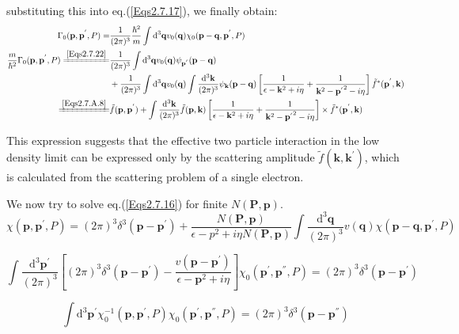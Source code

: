 substituting this into eq.(\ref{Eqs2.7.17}), we finally obtain:
\begin{equation} \label{Eqs2.7.23} \begin{split}
\Gamma_0(\mathbf{p},\mathbf{p}^{'},P) =& \frac{1}{(2\pi)^3} \frac{\hbar^2}{m} \int \mathrm{d}^3\mathbf{q} v_0(\mathbf{q}) \chi_0(\mathbf{p}-\mathbf{q},\mathbf{p}^{'},P)\\
\frac{m}{\hbar^2}\Gamma_0(\mathbf{p},\mathbf{p}^{'},P) \xlongequal{\ref{Eqs2.7.22}}&\frac{1}{(2\pi)^3} \int \mathrm{d}^3 \mathbf{q} v_0(\mathbf{q}) \psi_{\mathbf{p}^{'}}(\mathbf{p}-\mathbf{q})\\
&+ \frac{1}{(2\pi)^3} \int \mathrm{d}^3 \mathbf{q} v_0(\mathbf{q}) \int \frac{\mathrm{d}^3\mathbf{k}}{(2\pi)^3} \psi_{\mathbf{k}}(\mathbf{p}-\mathbf{q})\left[ \frac{1}{\epsilon-\mathbf{k}^2+i \eta} + \frac{1}{\mathbf{k}^2-{\mathbf{p}^{'}}^2-i \eta} \right] \tilde{f}^{*}(\mathbf{p}^{'},\mathbf{k})\\
\xlongequal{\ref{Eqs2.7.A.8}}& \tilde{f}(\mathbf{p},\mathbf{p}^{'}) + \int \frac{\mathrm{d}^3 \mathbf{k}}{(2\pi)^3} \tilde{f}(\mathbf{p},\mathbf{k})\left[ \frac{1}{\epsilon-\mathbf{k}^2+i \eta} + \frac{1}{\mathbf{k}^2-{\mathbf{p}^{'}}^2-i \eta} \right] \times \tilde{f}^{*}(\mathbf{p}^{'},\mathbf{k})
\end{split}\end{equation}

This expression suggests that the effective two particle interaction in the low density limit can be expressed only by the scattering amplitude $\tilde{f}(\mathbf{k},\mathbf{k}^{'})$, which is calculated from the scattering problem of a single electron.

We now try to solve eq.(\ref{Eqs2.7.16}) for finite $N(\mathbf{P},\mathbf{p})$.
\begin{equation*} \label{Eqs2.7.16'} \tag{2.7.16'}
\chi(\mathbf{p},\mathbf{p}^{'},P)=(2\pi)^3 \delta^3(\mathbf{p}-\mathbf{p}^{'}) + \frac{N(\mathbf{P},\mathbf{p})}{\epsilon - p^2 + i \eta N(\mathbf{P},\mathbf{p})} \int \frac{\mathrm{d}^3\mathbf{q}}{(2\pi)^3}v(\mathbf{q})\chi(\mathbf{p}-\mathbf{q},\mathbf{p}^{'},P)
\end{equation*}

\[\int \frac{\mathrm{d}^3\mathbf{p}^{'}}{(2\pi)^3}\left[ (2\pi)^3 \delta^3(\mathbf{p}-\mathbf{p}^{'})-\frac{v(\mathbf{p}-\mathbf{p}^{'})}{\epsilon-\mathbf{p}^2+i \eta} \right] \chi_0(\mathbf{p}^{'},\mathbf{p}^{''},P) = (2\pi)^3 \delta^3(\mathbf{p}-\mathbf{p}^{'}) \]

\[ \int \mathrm{d}^3 \mathbf{p}^{'} \chi_0^{-1}(\mathbf{p},\mathbf{p}^{'},P)\chi_0(\mathbf{p}^{'},\mathbf{p}^{''},P) = (2\pi)^3 \delta^3(\mathbf{p}-\mathbf{p}^{''})\]

